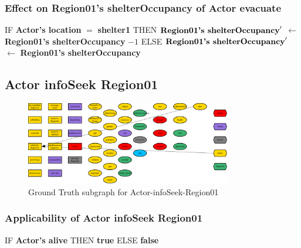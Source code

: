 \documentclass{article}%
\begin{document}
%
\subsubsection{Effect on Region01's shelterOccupancy of Actor evacuate}%
\label{ssubsec:Effect on Region01's shelterOccupancy of Actor evacuate}%
\begin{flushleft}%
IF %
\textbf{Actor's location}%
$=$%
\textbf{shelter1}%
\linebreak%
\hspace*{2em}%
THEN %
$\mbox{\textbf{Region01's shelterOccupancy}} '$%
$\leftarrow$%
\textbf{Region01's shelterOccupancy}%
${-}1$%
\linebreak%
\hspace*{2em}%
ELSE %
$\mbox{\textbf{Region01's shelterOccupancy}} '$%
$\leftarrow$%
\textbf{Region01's shelterOccupancy}%
\end{flushleft}

%
\subsection{Actor infoSeek Region01}%
\label{subsec:Actor infoSeek Region01}%


\begin{figure}[ht]%
\centering%
\includegraphics[width=0.8\textwidth]{images/Actor-infoSeek-Region01.png}%
\caption{Ground Truth subgraph for Actor{-}infoSeek{-}Region01}%
\end{figure}

%
\subsubsection{Applicability of Actor infoSeek Region01}%
\label{ssubsec:Applicability of Actor infoSeek Region01}%
\begin{flushleft}%
IF %
\textbf{Actor's alive}%
\linebreak%
\hspace*{2em}%
THEN %
\textbf{true}%
\linebreak%
\hspace*{2em}%
ELSE %
\textbf{false}%
\end{flushleft}
\end{document}
